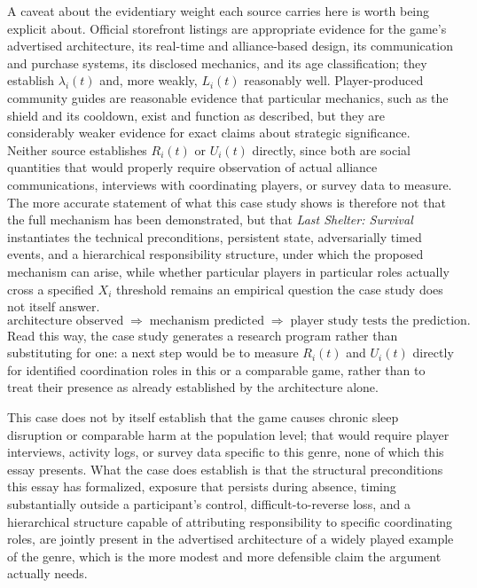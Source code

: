 \documentclass[11pt]{article}
\begin{document}
A caveat about the evidentiary weight each source carries here is worth being explicit about. Official storefront listings are appropriate evidence for the game's advertised architecture, its real-time and alliance-based design, its communication and purchase systems, its disclosed mechanics, and its age classification; they establish $\lambda_i(t)$ and, more weakly, $L_i(t)$ reasonably well. Player-produced community guides are reasonable evidence that particular mechanics, such as the shield and its cooldown, exist and function as described, but they are considerably weaker evidence for exact claims about strategic significance. Neither source establishes $R_i(t)$ or $U_i(t)$ directly, since both are social quantities that would properly require observation of actual alliance communications, interviews with coordinating players, or survey data to measure. The more accurate statement of what this case study shows is therefore not that the full mechanism has been demonstrated, but that \emph{Last Shelter: Survival} instantiates the technical preconditions, persistent state, adversarially timed events, and a hierarchical responsibility structure, under which the proposed mechanism can arise, while whether particular players in particular roles actually cross a specified $X_i$ threshold remains an empirical question the case study does not itself answer.
\[
\text{architecture observed} \;\Longrightarrow\; \text{mechanism predicted} \;\Longrightarrow\; \text{player study tests the prediction.}
\]
Read this way, the case study generates a research program rather than substituting for one: a next step would be to measure $R_i(t)$ and $U_i(t)$ directly for identified coordination roles in this or a comparable game, rather than to treat their presence as already established by the architecture alone.

This case does not by itself establish that the game causes chronic sleep disruption or comparable harm at the population level; that would require player interviews, activity logs, or survey data specific to this genre, none of which this essay presents. What the case does establish is that the structural preconditions this essay has formalized, exposure that persists during absence, timing substantially outside a participant's control, difficult-to-reverse loss, and a hierarchical structure capable of attributing responsibility to specific coordinating roles, are jointly present in the advertised architecture of a widely played example of the genre, which is the more modest and more defensible claim the argument actually needs.
\end{document}
